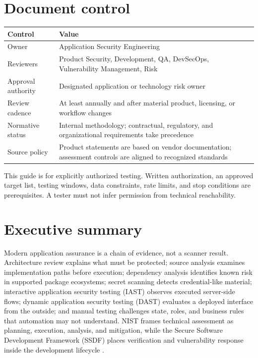 \documentclass[11pt,letterpaper]{article}
\begin{document}
\section*{Document control}
\begin{tabularx}{\textwidth}{@{}L{1.55in}Y@{}}
\toprule
\textbf{Control} & \textbf{Value} \\
\midrule
Owner & Application Security Engineering \\
Reviewers & Product Security, Development, QA, DevSecOps, Vulnerability Management, Risk \\
Approval authority & Designated application or technology risk owner \\
Review cadence & At least annually and after material product, licensing, or workflow changes \\
Normative status & Internal methodology; contractual, regulatory, and organizational requirements take precedence \\
Source policy & Product statements are based on vendor documentation; assessment controls are aligned to recognized standards \\
\bottomrule
\end{tabularx}

\begin{warnbox}
This guide is for explicitly authorized testing. Written authorization, an approved target list, testing windows, data constraints, rate limits, and stop conditions are prerequisites. A tester must not infer permission from technical reachability.
\end{warnbox}

\tableofcontents
\clearpage
\listoftables
{}
\clearpage
\listoffigures
{}
\clearpage
{}

\section{Executive summary}

Modern application assurance is a chain of evidence, not a scanner result. Architecture review explains what must be protected; source analysis examines implementation paths before execution; dependency analysis identifies known risk in supported package ecosystems; secret scanning detects credential-like material; interactive application security testing (IAST) observes executed server-side flows; dynamic application security testing (DAST) evaluates a deployed interface from the outside; and manual testing challenges state, roles, and business rules that automation may not understand. NIST frames technical assessment as planning, execution, analysis, and mitigation, while the Secure Software Development Framework (SSDF) places verification and vulnerability response inside the development lifecycle \citep{nist800115,nist800218}.
\end{document}
